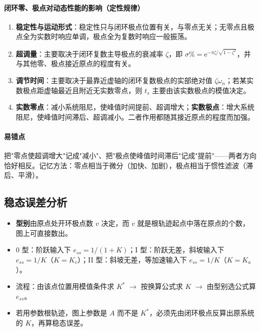 \paragraph{闭环零、极点对动态性能的影响（定性规律）}
\begin{enumerate}
    \item \textbf{稳定性与运动形式}：稳定性只与闭环极点位置有关，与零点无关；无零点且极点全为实数时响应单调，极点全为复数时响应一般振荡。
    \item \textbf{超调量}：主要取决于闭环复数主导极点的衰减率 $\zeta$，即 $\sigma\%=\mathrm{e}^{-\pi\zeta/\sqrt{1-\zeta^2}}$，并与其他零、极点接近原点的程度有关。
    \item \textbf{调节时间}：主要取决于最靠近虚轴的闭环复数极点的实部绝对值 $\zeta\omega_n$；若某实数极点距虚轴最近且附近无实数零点，则 $t_s$ 主要由该实数极点的模值决定。
    \item \textbf{实数零点}：减小系统阻尼，使峰值时间提前、超调增大；\textbf{实数极点}：增大系统阻尼，使峰值时间滞后、超调减小。二者作用都随其接近原点的程度而加强。
\end{enumerate}

\paragraph{易错点}把"零点使超调增大"记成"减小"、把"极点使峰值时间滞后"记成"提前"——两者方向恰好相反。记忆方法：零点相当于微分（加快、加剧），极点相当于惯性滤波（滞后、平滑）。

\subsection{稳态误差分析}
\begin{itemize}
    \item \textbf{型别}由原点处开环极点数 $v$ 决定，而 $v$ 就是根轨迹起点中落在原点的个数，图上可直接数出。
    \item 0 型：阶跃输入下 $e_{ss}=1/(1+K)$；I 型：阶跃无差，斜坡输入下 $e_{ss}=1/K$（$K=K_v$）；II 型：斜坡无差，等加速输入下 $e_{ss}=1/K$（$K=K_a$）。
    \item 流程：由该点位置用模值条件求 $K^*$ $\to$ 按换算公式求 $K$ $\to$ 由型别选公式算 $e_{ss}$。
    \item 若用参数根轨迹，图上参数是 $A$ 而不是 $K^*$，必须先由闭环极点反算出原系统的 $K$，再算稳态误差。
\end{itemize}

\medskip

